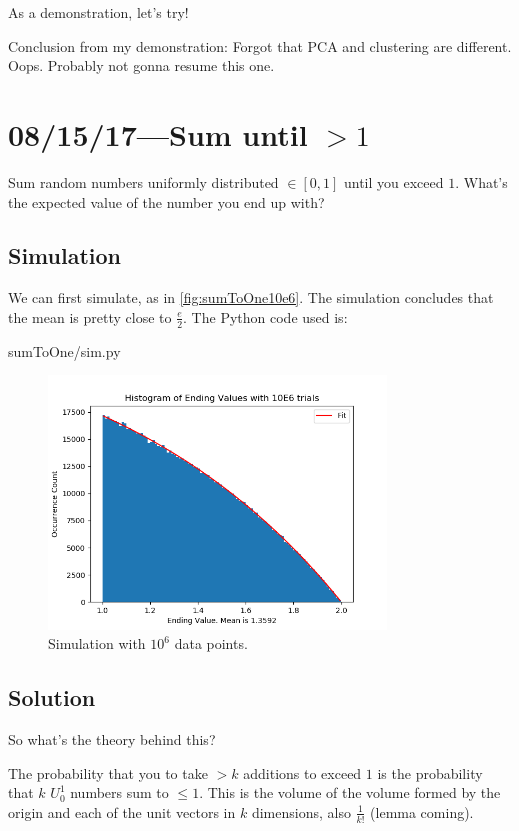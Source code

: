 \documentclass[12pt]{report}
\begin{document}
As a demonstration, let's try!

Conclusion from my demonstration: Forgot that PCA and clustering are different.
Oops. Probably not gonna resume this one.

\chapter{08/15/17---Sum until $> 1$}

Sum random numbers uniformly distributed $\in [0,1]$ until you exceed $1$.
What's the expected value of the number you end up with?

\section{Simulation}

We can first simulate, as in \autoref{fig:sumToOne10e6}. The simulation
concludes that the mean is pretty close to $\frac{e}{2}$. The Python code used
is:

{sumToOne/sim.py}
\begin{figure}[H]
    \centering
    \includegraphics[width=0.8\textwidth]{sumToOne/trials10e6.png}
    \caption{Simulation with $10^6$ data points.\label{fig:sumToOne10e6}}
\end{figure}

\section{Solution}

So what's the theory behind this?

The probability that you to take $> k$ additions to exceed $1$ is the
probability that $k$ $U_0^1$ numbers sum to $\leq 1$. This is the volume of the
volume formed by the origin and each of the unit vectors in $k$ dimensions, also
$\frac{1}{k!}$ (lemma coming).
\end{document}
